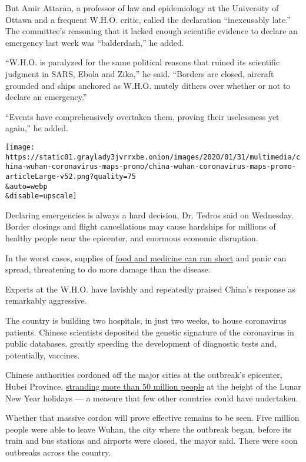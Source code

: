 But Amir Attaran, a professor of law and epidemiology at the University
of Ottawa and a frequent W.H.O. critic, called the declaration
``inexcusably late.'' The committee's reasoning that it lacked enough
scientific evidence to declare an emergency last week was
``balderdash,'' he added.

``W.H.O. is paralyzed for the same political reasons that ruined its
scientific judgment in SARS, Ebola and Zika,'' he said. ``Borders are
closed, aircraft grounded and ships anchored as W.H.O. mutely dithers
over whether or not to declare an emergency.''

``Events have comprehensively overtaken them, proving their uselessness
yet again,'' he added.

\texttt{[image: https://static01.graylady3jvrrxbe.onion/images/2020/01/31/multimedia/china-wuhan-coronavirus-maps-promo/china-wuhan-coronavirus-maps-promo-articleLarge-v52.png?quality=75\\\&auto=webp\\\&disable=upscale]}

Declaring emergencies is always a hard decision, Dr. Tedros said on
Wednesday. Border closings and flight cancellations may cause hardships
for millions of healthy people near the epicenter, and enormous economic
disruption.

In the worst cases, supplies of
\href{https://www.businessinsider.com/no-food-crowded-hospitals-wuhan-first-week-in-coronavirus-quarantine-2020-1}{food
and medicine can run short} and panic can spread, threatening to do more
damage than the disease.

Experts at the W.H.O. have lavishly and repeatedly praised China's
response as remarkably aggressive.

The country is building two hospitals, in just two weeks, to house
coronavirus patients. Chinese scientists deposited the genetic signature
of the coronavirus in public databases, greatly speeding the development
of diagnostic tests and, potentially, vaccines.

Chinese authorities cordoned off the major cities at the outbreak's
epicenter, Hubei Province,
\href{https://thehill.com/changing-america/well-being/longevity/479733-more-than-30-million-on-lockdown-amid-coronavirus}{stranding
more than 50 million people} at the height of the Lunar New Year
holidays --- a measure that few other countries could have undertaken.

Whether that massive cordon will prove effective remains to be seen.
Five million people were able to leave Wuhan, the city where the
outbreak began, before its train and bus stations and airports were
closed, the mayor said. There were soon outbreaks across the country.

